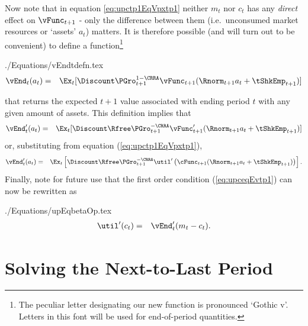 \documentclass[titlepage]{\econtex}
\begin{document}
Now note that in equation \eqref{eq:upctp1EqVpxtp1} neither ${m}_{t}$ nor
${c}_{t}$ has any \textit{direct} effect on $\null{\vFunc}_{t+1}$ - only the difference between them (i.e.\  unconsumed market resources or `assets' ${a}_t$) matters.  It is therefore possible (and will turn
out to be convenient) to define a function\footnote{The peculiar letter designating our new function is pronounced `Gothic v'.  Letters in this font
will be used for end-of-period quantities.}
\begin{verbatimwrite}{./Equations/vEndtdefn.tex}
\begin{eqnarray}
        {\vEnd}_{t}({a}_{t}) & = & \Ex_{t}[\Discount \PGro_{t+1}^{1-\CRRA}\null{\vFunc}_{t+1}(\Rnorm_{t+1} {a}_{t}+{\tShkEmp}_{t+1})]  \label{eq:vEndtdefn}
\end{eqnarray}
\end{verbatimwrite}

that returns the expected $t+1$ value associated with ending period
$t$ with any given amount of
 assets.  This definition
implies that
\begin{eqnarray}
        {\vEnd}_{t}^{\prime}({a}_{t}) & = & \Ex_{t}[\Discount \Rfree \PGro_{t+1}^{-\CRRA} \null{\vFunc}_{t+1}^{\prime}(\Rnorm_{t+1} {a}_{t}+{\tShkEmp}_{t+1})]  \label{eq:vEndPrimetdefn}
\end{eqnarray}
or, substituting from equation (\ref{eq:upctp1EqVpxtp1}),
\begin{eqnarray}
        {\vEnd}_{t}^{\prime}({a}_{t}) & = & \Ex_{t}\left[\Discount \Rfree \PGro_{t+1}^{-\CRRA} \util^{\prime}\left(\cFunc_{t+1}(\Rnorm_{t+1} {a}_{t}+{\tShkEmp}_{t+1})\right)\right].  \label{eq:vEndPrimetOfc}
\end{eqnarray}
Finally, note for future use that the first order condition
(\ref{eq:upceqEvtp1}) can now be rewritten as
\begin{verbatimwrite}{./Equations/upEqbetaOp.tex}
\begin{eqnarray}
\util^{\prime}({c}_{t})  & = & {\vEnd}_{t}^{\prime}({m}_{t}-{c}_{t}).
\label{eq:upEqbetaOp}
\end{eqnarray}
\end{verbatimwrite}



\hypertarget{Solving-the-Next-To-Last-Period}{}
\section{Solving the Next-to-Last Period}\label{sec:NextToLast}
\end{document}
